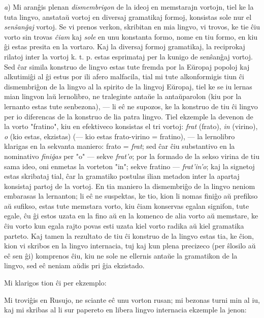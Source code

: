    \emph{a}) Mi aran\^gis plenan {\sl dismembrigon} de la ideoj en memstarajn
vortojn, tiel ke la tuta lingvo, anstata\u u vortoj en diversaj
gramatikaj formoj, konsistas sole nur el {\sl sen\^san\^gaj} vortoj.
Se vi prenos verkon, skribitan en mia lingvo, vi trovos, ke tie
\^ciu vorto sin trovas {\sl \^ciam} kaj {\sl sole} en unu konstanta
formo, nome en tiu formo, en kiu \^gi estas presita en la vortaro.
Kaj la diversaj formoj gramatikaj, la reciprokaj rilatoj inter la
vortoj k. t. p. estas esprimataj per la kunigo de sen\^san\^gaj
vortoj. Sed \^car simila konstruo de lingvo estas tute fremda por la
E\u uropaj popoloj kaj alkutimi\^gi al \^gi estus por ili afero
malfacila, tial mi tute alkonformigis tiun \^ci dismembri\^gon de la
lingvo al la spirito de la lingvoj E\u uropaj, tiel ke se iu lernas
mian lingvon la\u u lernolibro, ne traleginte anta\u ue la anta\u
uparolon (kiu por la lernanto estas tute senbezona), --- li e\^c ne
supozos, ke la konstruo de tiu \^ci lingvo per io diferencas de la
konstruo de lia patra lingvo. Tiel ekzemple la devenon de la vorto
"fratino", kiu en efektiveco konsistas el tri vortoj: {\sl frat}
(frato), {\sl in} (virino), {\sl o} (kio estas, ekzistas) (--- kio
estas frato-virino = fratino),
--- la lernolibro klarigas en la sekvanta maniero: frato = {\sl frat};
sed \^car \^ciu substantivo en la nominativo {\sl fini\^gas} per
"o" --- sekve {\sl frat'o}; por la formado de la sekso virina de
tiu sama ideo, oni enmetas la vorteton "in"; sekve fratino ---
{\sl frat'in'o}; kaj la signetoj estas skribataj tial, \^car la
gramatiko postulas ilian metadon inter la apartaj konsistaj partoj
de la vortoj. En tia maniero la dismembri\^go de la lingvo neniom
embarasas la lernanton; li e\^c ne suspektas, ke tio, kion li nomas
fini\^go a\u u prefikso a\u u sufikso, estas tute memstara vorto,
kiu \^ciam konservas egalan signifon, tute egale, \^cu \^gi estos
uzata en la fino a\u u en la komenco de alia vorto a\u u memstare,
ke \^ciu vorto kun egala rajto povas esti uzata kiel vorto radika
a\u u kiel gramatika parteto. Kaj tamen la rezultato de tiu \^ci
konstruo de la lingvo estas tia, ke \^cion, kion vi skribos en la
lingvo internacia, tuj kaj kun plena precizeco (per \^slosilo a\u u
e\^c sen \^gi) komprenos \^ciu, kiu ne sole ne ellernis anta\u ue la
gramatikon de la lingvo, sed e\^c neniam a\u udis pri \^gia
ekzistado.

   Mi klarigos tion \^ci per ekzemplo:

   Mi trovi\^gis en Rusujo, ne sciante e\^c unu vorton rusan; mi bezonas
turni min al iu, kaj mi skribas al li sur papereto en libera lingvo
internacia ekzemple la jenon:

